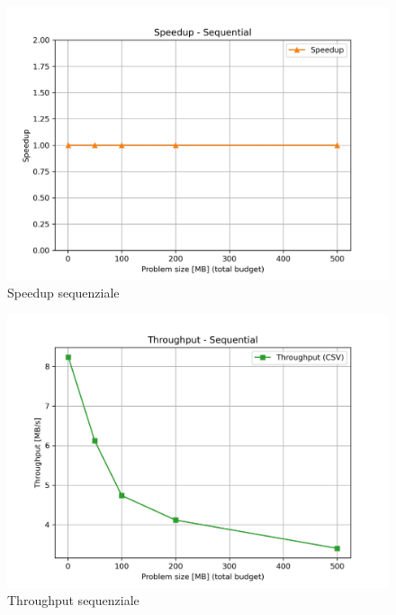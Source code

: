 			\begin{figure}[H]
				\centering
				\includegraphics[width=1\linewidth]{img/seq_plots/seq_speedup.jpg}
				\caption{Speedup sequenziale}
				\label{fig:seq_speedup}
			\end{figure}
			
			\begin{figure}[H]
				\centering
				\includegraphics[width=1\linewidth]{img/seq_plots/seq_throughput.jpg}
				\caption{Throughput sequenziale}
				\label{fig:seq_throughput}
			\end{figure}
			
